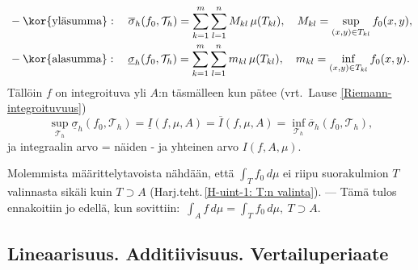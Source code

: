 %
\begin{align*}
&-\text{\kor{yläsumma}}: \quad \overline{\sigma}_h(f_0,\mathcal{T}_h)
                          =\sum_{k=1}^m\sum_{l=1}^n M_{kl}\,\mu(T_{kl}), \quad
                             M_{kl}=\sup_{(x,y)\in T_{kl}} f_0(x,y), \\
&-\text{\kor{alasumma}}: \quad \underline{\sigma}_h(f_0,\mathcal{T}_h)
                          =\sum_{k=1}^m\sum_{l=1}^n m_{kl}\,\mu(T_{kl}), \quad
                             m_{kl}=\inf_{(x,y)\in T_{kl}} f_0(x,y).
\end{align*}
Tällöin $f$ on integroituva yli $A$:n täsmälleen kun pätee
(vrt.\ Lause \ref{Riemann-integroituvuus})
\[
\sup_{\mathcal{T}_h} \underline{\sigma}_h(f_0,\mathcal{T}_h) 
                     = \underline{I}(f,\mu,A) = \overline{I}(f,\mu,A)
                     = \inf_{\mathcal{T}_h} \overline{\sigma}_h(f_0,\mathcal{T}_h),
\]
%
ja integraalin arvo = näiden - ja  yhteinen arvo $I(f,A,\mu)$.

Molemmista määrittelytavoista nähdään, että $\int_T f_0\,d\mu$ ei riipu suorakulmion $T$
valinnasta sikäli kuin $T \supset A$ (Harj.teht.\,\ref{H-uint-1: T:n valinta}). --- Tämä tulos
ennakoitiin jo edellä, kun sovittiin: $\,\int_A f\,d\mu = \int_T f_0\,d\mu,\ T \supset A$.

\subsection*{Lineaarisuus. Additiivisuus. Vertailuperiaate}

